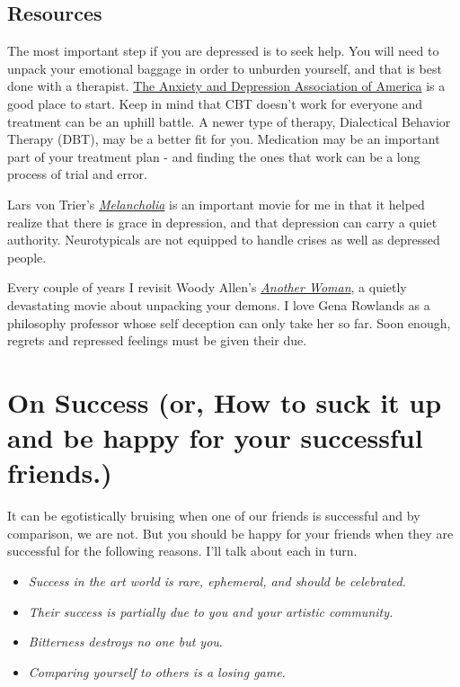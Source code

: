 \documentclass[
]{book}
\providecommand{\tightlist}{%
  \setlength{\itemsep}{0pt}\setlength{\parskip}{0pt}}
\begin{document}
\hypertarget{resources-3}{%
\section{Resources}\label{resources-3}}

The most important step if you are depressed is to seek help. You will need to unpack your emotional baggage in order to unburden yourself, and that is best done with a therapist. \href{http://www.adaa.org/finding-help}{The Anxiety and Depression Association of America} is a good place to start. Keep in mind that CBT doesn't work for everyone and treatment can be an uphill battle. A newer type of therapy, Dialectical Behavior Therapy (DBT), may be a better fit for you. Medication may be an important part of your treatment plan - and finding the ones that work can be a long process of trial and error.

Lars von Trier's \emph{\href{http://m.imdb.com/title/tt1527186/}{Melancholia}} is an important movie for me in that it helped realize that there is grace in depression, and that depression can carry a quiet authority. Neurotypicals are not equipped to handle crises as well as depressed people.

Every couple of years I revisit Woody Allen's \emph{\href{http://m.imdb.com/title/tt0094663}{Another Woman}}, a quietly devastating movie about unpacking your demons. I love Gena Rowlands as a philosophy professor whose self deception can only take her so far. Soon enough, regrets and repressed feelings must be given their due.

\hypertarget{on-success-or-how-to-suck-it-up-and-be-happy-for-your-successful-friends.}{%
\chapter{On Success (or, How to suck it up and be happy for your successful friends.)}\label{on-success-or-how-to-suck-it-up-and-be-happy-for-your-successful-friends.}}

It can be egotistically bruising when one of our friends is successful and by comparison, we are not. But you should be happy for your friends when they are successful for the following reasons. I'll talk about each in turn.

\begin{itemize}
\tightlist
\item
  \emph{Success in the art world is rare, ephemeral, and should be celebrated.}
\item
  \emph{Their success is partially due to you and your artistic community.}
\item
  \emph{Bitterness destroys no one but you}.
\item
  \emph{Comparing yourself to others is a losing game.}
\end{itemize}
\end{document}

